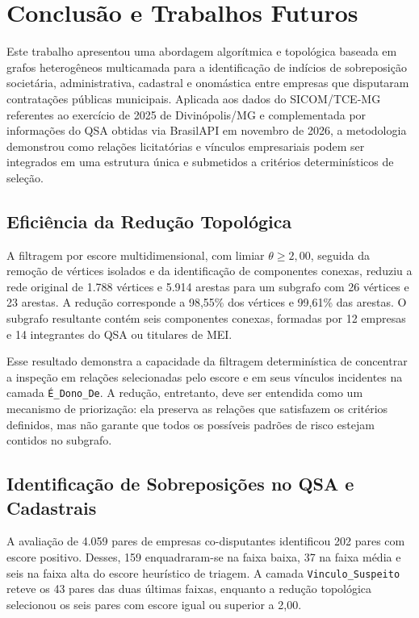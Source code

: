 \section{Conclusão e Trabalhos Futuros}
\label{sec:conclusao}

Este trabalho apresentou uma abordagem algorítmica e topológica baseada em grafos heterogêneos multicamada para a identificação de indícios de sobreposição societária, administrativa, cadastral e onomástica entre empresas que disputaram contratações públicas municipais. Aplicada aos dados do SICOM/TCE-MG referentes ao exercício de 2025 de Divinópolis/MG e complementada por informações do QSA obtidas via BrasilAPI em novembro de 2026, a metodologia demonstrou como relações licitatórias e vínculos empresariais podem ser integrados em uma estrutura única e submetidos a critérios determinísticos de seleção.

\subsection{Eficiência da Redução Topológica}

A filtragem por escore multidimensional, com limiar $\theta\geq2{,}00$, seguida da remoção de vértices isolados e da identificação de componentes conexas, reduziu a rede original de 1.788 vértices e 5.914 arestas para um subgrafo com 26 vértices e 23 arestas. A redução corresponde a 98,55\% dos vértices e 99,61\% das arestas. O subgrafo resultante contém seis componentes conexas, formadas por 12 empresas e 14 integrantes do QSA ou titulares de MEI.

Esse resultado demonstra a capacidade da filtragem determinística de concentrar a inspeção em relações selecionadas pelo escore e em seus vínculos incidentes na camada \texttt{É\_Dono\_De}. A redução, entretanto, deve ser entendida como um mecanismo de priorização: ela preserva as relações que satisfazem os critérios definidos, mas não garante que todos os possíveis padrões de risco estejam contidos no subgrafo.

\subsection{Identificação de Sobreposições no QSA e Cadastrais}

A avaliação de 4.059 pares de empresas co-disputantes identificou 202 pares com escore positivo. Desses, 159 enquadraram-se na faixa baixa, 37 na faixa média e seis na faixa alta do escore heurístico de triagem. A camada \texttt{Vinculo\_Suspeito} reteve os 43 pares das duas últimas faixas, enquanto a redução topológica selecionou os seis pares com escore igual ou superior a 2,00.

